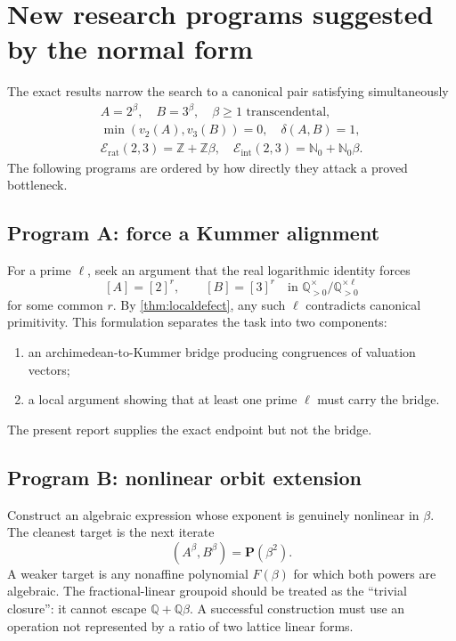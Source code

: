 \documentclass[11pt]{article}
\numberwithin{equation}{section}
\theoremstyle{definition}
\newcommand{\Q}{\mathbb{Q}}
\newcommand{\Z}{\mathbb{Z}}
\newcommand{\N}{\mathbb{N}}
\newcommand{\Pair}{\mathbf P}
\newcommand{\defect}{\delta}
\newcommand{\Erat}{\mathcal E_{\mathrm{rat}}}
\newcommand{\Eint}{\mathcal E_{\mathrm{int}}}
\begin{document}
\section{New research programs suggested by the normal form}

The exact results narrow the search to a canonical pair satisfying simultaneously
\begin{equation}\label{eq:canonicalresearch}
 \begin{gathered}
  A=2^\beta,\quad B=3^\beta,\quad \beta\ge1\text{ transcendental},\\
  \min(v_2(A),v_3(B))=0,\quad \defect(A,B)=1,\\
  \Erat(2,3)=\Z+\Z\beta,
  \quad
  \Eint(2,3)=\N_0+\N_0\beta.
 \end{gathered}
\end{equation}
The following programs are ordered by how directly they attack a proved bottleneck.

\subsection{Program A: force a Kummer alignment}

For a prime \(\ell\), seek an argument that the real logarithmic identity forces
\[
       [A]=[2]^r,
       \qquad
       [B]=[3]^r
       \quad\text{in }\Q_{>0}^{\times}/\Q_{>0}^{\times\ell}
\]
for some common \(r\). By \cref{thm:localdefect}, any such \(\ell\) contradicts canonical primitivity. This formulation separates the task into two components:
\begin{enumerate}
\item an archimedean-to-Kummer bridge producing congruences of valuation vectors;
\item a local argument showing that at least one prime \(\ell\) must carry the bridge.
\end{enumerate}
The present report supplies the exact endpoint but not the bridge.

\subsection{Program B: nonlinear orbit extension}

Construct an algebraic expression whose exponent is genuinely nonlinear in \(\beta\). The cleanest target is the next iterate
\[
       (A^\beta,B^\beta)=\Pair(\beta^2).
\]
A weaker target is any nonaffine polynomial \(F(\beta)\) for which both powers are algebraic. The fractional-linear groupoid should be treated as the ``trivial closure'': it cannot escape \(\Q+\Q\beta\). A successful construction must use an operation not represented by a ratio of two lattice linear forms.
\end{document}
